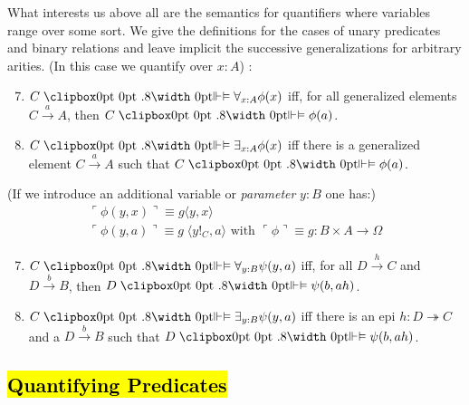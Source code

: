\begin{definition}
\newpage	 
What interests us above all are the semantics for quantifiers where variables range over some sort.
We give the definitions for the cases of unary predicates and binary relations and leave implicit the successive generalizations for arbitrary arities.
	\newline
	 (In this case we quantify over $x:A$) :
\begin{enumerate}[label=(\roman*)]
	\setcounter{enumi}{6}
	\item $C \VDashA \forall_{x : A} \phi(x)$ iff, for all generalized elements $C \xrightarrow{a} A$, then $C \VDashA \phi(a)$.
	\item $C \VDashA \exists_{x : A} \phi(x)$ iff there is a generalized element $C \xrightarrow{a} A$ such that $C \VDashA \phi(a)$.
\end{enumerate}
	(If we introduce an additional variable or \emph{parameter} $y : B$  one has:)
	\begin{gather*}
		\ulcorner \phi(y,x) \urcorner \equiv g \langle y,x \rangle\\
		\ulcorner \phi(y,a) \urcorner \equiv g \; \langle y !_C, a \rangle \text{ with }\ulcorner \phi \urcorner \equiv g: B \times A \rightarrow \Omega
	\end{gather*}
	\begin{enumerate}[label=(\roman*)']
	 \setcounter{enumi}{6}
	\item $C \VDashA \forall_{y : B} \psi(y,a)$ iff, for all $D \xrightarrow{h} C$ and $D \xrightarrow{b} B$, then $D \VDashA \psi(b,ah)$.
	\item $C \VDashA \exists_{y : B} \psi(y,a)$ iff there is an epi $h : D\twoheadrightarrow C$ and a $D \xrightarrow{b} B$ such that $D \VDashA \psi(b,ah)$.
	\end{enumerate}
\end{definition}

\newpage
\subsection{\hl{Quantifying Predicates}}

